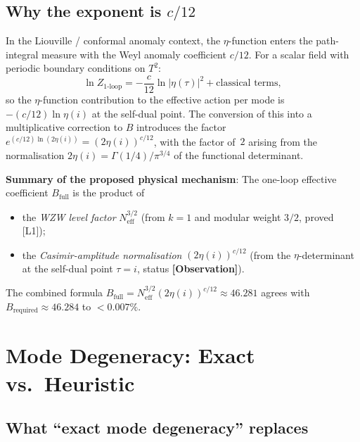 \documentclass[12pt,a4paper]{article}
\theoremstyle{definition}
\theoremstyle{remark}
\newcommand{\OBS}{\textbf{[Observation]}}
\begin{document}
\subsection{Why the exponent is $c/12$}

In the Liouville / conformal anomaly context, the $\eta$-function enters
the path-integral measure with the Weyl anomaly coefficient $c/12$.  For a
scalar field with periodic boundary conditions on $T^2$:
\begin{equation}
  \ln Z_{\text{1-loop}} = -\frac{c}{12} \ln|\eta(\tau)|^2
  + \text{classical terms},
  \label{eq:cw:Z1loop}
\end{equation}
so the $\eta$-function contribution to the effective action per mode
is $-(c/12) \ln\eta(i)$ at the self-dual point.  The conversion of this
into a multiplicative correction to $B$ introduces the factor
$e^{(c/12)\ln(2\eta(i))} = (2\eta(i))^{c/12}$, with the factor of~$2$
arising from the normalisation $2\eta(i) = \Gamma(1/4)/\pi^{3/4}$ of the
functional determinant.

\begin{infobox}
\textbf{Summary of the proposed physical mechanism}:
The one-loop effective coefficient $B_{\mathrm{full}}$ is the product of
\begin{itemize}
  \item the \emph{WZW level factor} $N_{\mathrm{eff}}^{3/2}$ (from $k = 1$ and
        modular weight $3/2$, proved [L1]);
  \item the \emph{Casimir-amplitude normalisation} $(2\eta(i))^{c/12}$
        (from the $\eta$-determinant at the self-dual point $\tau = i$,
        status \OBS).
\end{itemize}
The combined formula $B_{\mathrm{full}} = N_{\mathrm{eff}}^{3/2} (2\eta(i))^{c/12}
\approx 46.281$ agrees with $B_{\mathrm{required}} \approx 46.284$ to
$<0.007\%$.
\end{infobox}

\section{Mode Degeneracy: Exact vs.\ Heuristic}
\label{sec:cw:degen}

\subsection{What ``exact mode degeneracy'' replaces}
\end{document}
